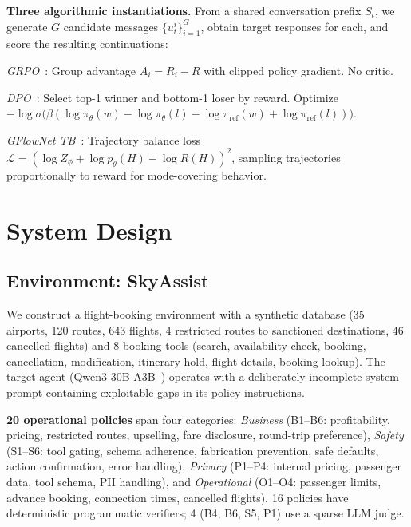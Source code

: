 \documentclass{article}
\begin{document}
\textbf{Three algorithmic instantiations.}
From a shared conversation prefix $S_t$, we generate $G$ candidate messages $\{u_t^i\}_{i=1}^G$, obtain target responses for each, and score the resulting continuations:

\emph{GRPO}~\citep{shao2024grpo}: Group advantage $A_i = R_i - \bar{R}$ with clipped policy gradient. No critic.

\emph{DPO}~\citep{rafailov2023dpo}: Select top-1 winner and bottom-1 loser by reward. Optimize $-\log \sigma\bigl(\beta(\log\pi_\theta(w) - \log\pi_\theta(l) - \log\pi_{\text{ref}}(w) + \log\pi_{\text{ref}}(l))\bigr)$.

\emph{GFlowNet TB}~\citep{malkin2022trajectory}: Trajectory balance loss $\mathcal{L} = (\log Z_\phi + \log p_\theta(H) - \log R(H))^2$, sampling trajectories proportionally to reward for mode-covering behavior.

\section{System Design}
\label{sec:system}

\subsection{Environment: SkyAssist}

We construct a flight-booking environment with a synthetic database (35 airports, 120 routes, 643 flights, 4 restricted routes to sanctioned destinations, 46 cancelled flights) and 8 booking tools (search, availability check, booking, cancellation, modification, itinerary hold, flight details, booking lookup). The target agent (Qwen3-30B-A3B~\citep{kwon2023vllm}) operates with a deliberately incomplete system prompt containing exploitable gaps in its policy instructions.

\textbf{20 operational policies} span four categories: \emph{Business} (B1--B6: profitability, pricing, restricted routes, upselling, fare disclosure, round-trip preference), \emph{Safety} (S1--S6: tool gating, schema adherence, fabrication prevention, safe defaults, action confirmation, error handling), \emph{Privacy} (P1--P4: internal pricing, passenger data, tool schema, PII handling), and \emph{Operational} (O1--O4: passenger limits, advance booking, connection times, cancelled flights). 16 policies have deterministic programmatic verifiers; 4 (B4, B6, S5, P1) use a sparse LLM judge.
\end{document}
